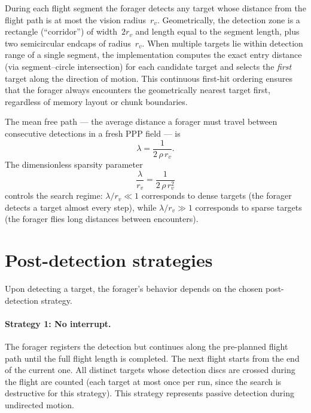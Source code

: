During each flight segment the forager detects any target whose
distance from the flight path is at most the vision radius~$r_v$.
Geometrically, the detection zone is a rectangle (``corridor'') of
width~$2r_v$ and length equal to the segment length, plus two
semicircular endcaps of radius~$r_v$.
When multiple targets lie within detection range of a single
segment, the implementation computes the exact entry distance
(via segment--circle intersection) for each candidate target
and selects the \emph{first} target along the direction of motion.
This continuous first-hit ordering ensures that the forager
always encounters the geometrically nearest target first,
regardless of memory layout or chunk boundaries.

The mean free path --- the average distance a forager must travel
between consecutive detections in a fresh PPP field --- is
\begin{equation}
  \lambda = \frac{1}{2\,\rho\,r_v}.
  \label{eq:lambda}
\end{equation}
The dimensionless sparsity parameter
\begin{equation}
  \frac{\lambda}{r_v} = \frac{1}{2\,\rho\,r_v^2}
  \label{eq:sparsity}
\end{equation}
controls the search regime:
$\lambda/r_v \ll 1$ corresponds to dense targets (the
forager detects a target almost every step), while
$\lambda/r_v \gg 1$ corresponds to sparse targets (the
forager flies long distances between encounters).

\section{Post-detection strategies}
\label{sec:strategies}

Upon detecting a target, the forager's behavior depends on the
chosen post-detection strategy.

\paragraph{Strategy 1: No interrupt.}
The forager registers the detection but continues along the
pre-planned flight path until the full flight length is
completed.  The next flight starts from the end of the
current one.  All distinct targets whose detection discs
are crossed during the flight are counted (each target at
most once per run, since the search is destructive for this
strategy).  This strategy represents passive detection
during undirected motion.

